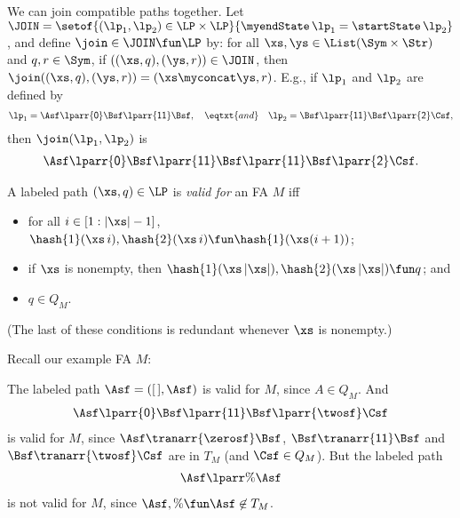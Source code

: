 We can join compatible paths together.  Let $\JOIN=
\setof{(\lp_1,\lp_2)\in\LP\times\LP}{\myendState\,\lp_1 = \startState\,\lp_2}$,
and define $\join\in\JOIN\fun\LP$ by: for all $\xs,\ys\in\List(\Sym\times\Str)$
and $q,r\in\Sym$, if $((\xs,q),(\ys,r))\in\JOIN$, then
$\join((\xs,q), (\ys,r)) = (\xs\myconcat\ys, r)$.  E.g., if
$\lp_1$ and $\lp_2$ are defined by
\begin{gather*}
\lp_1 = 
\Asf\lparr{\mathsf{0}}\Bsf\lparr{\mathsf{11}}\Bsf , \quad\eqtxt{and}\quad
\lp_2 =
\Bsf\lparr{\mathsf{11}}\Bsf\lparr{\mathsf{2}}\Csf ,
\end{gather*}
then $\join(\lp_1,\lp_2)$ is
\begin{gather*}
\Asf\lparr{\mathsf{0}}\Bsf\lparr{\mathsf{11}}\Bsf
\lparr{\mathsf{11}}\Bsf\lparr{\mathsf{2}}\Csf .
\end{gather*}

A labeled path $(\xs,q)\in\LP$ is \emph{valid for} an FA $M$ iff
\begin{itemize}
\item for all $i\in[1:|\xs|-1]$, $\hash{1}(\xs\,i),\hash{2}(\xs\,i)\fun
  \hash{1}(\xs(i+1))$;

\item if $\xs$ is nonempty, then $\hash{1}(\xs\,|\xs|),\hash{2}(\xs\,|\xs|)\fun
  q$; and

\item $q\in Q_M$.
\end{itemize}
(The last of these conditions is redundant whenever $\xs$ is nonempty.)

Recall our example FA $M$:
\begin{center}

\end{center}
The labeled path $\Asf=([\,],\Asf)$ is valid for $M$,
since $A\in Q_M$.  And
\begin{gather*}
\Asf\lparr{\mathsf{0}}\Bsf\lparr{\mathsf{11}}\Bsf\lparr{\twosf}\Csf
\end{gather*}
is valid for $M$, since $\Asf\tranarr{\zerosf}\Bsf$,
$\Bsf\tranarr{\mathsf{11}}\Bsf$ and $\Bsf\tranarr{\twosf}\Csf$ are in
$T_M$ (and $\Csf\in Q_M$). But the labeled path
\begin{gather*}
\Asf\lparr{\%}\Asf
\end{gather*}
is not valid for $M$, since $\Asf,\%\fun\Asf\not\in T_M$.

